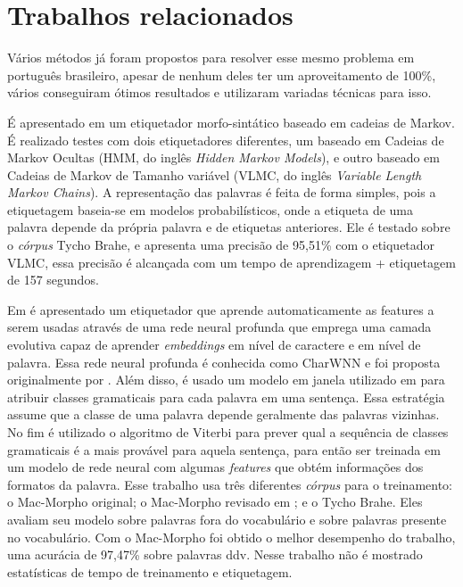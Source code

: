 \chapter{Trabalhos relacionados}\label{trabalhosrelacionados}

Vários métodos já foram propostos para resolver esse mesmo problema em português brasileiro, apesar de nenhum deles ter um aproveitamento de 100\%, vários conseguiram ótimos resultados e utilizaram variadas técnicas para isso.

É apresentado em \cite{kepler2005etiquetador} um etiquetador morfo-sintático baseado em cadeias de Markov. É realizado testes com dois etiquetadores diferentes, um baseado em Cadeias de Markov Ocultas (HMM, do inglês \textit{Hidden Markov Models}), e outro baseado em Cadeias de Markov de Tamanho variável (VLMC, do inglês \textit{Variable Length Markov Chains}). A representação das palavras é feita de forma simples, pois a etiquetagem baseia-se em modelos probabilísticos, onde a etiqueta de uma palavra depende da própria palavra e de etiquetas anteriores. Ele é testado sobre o \textit{córpus} Tycho Brahe, e apresenta uma precisão de 95,51\% com o etiquetador VLMC, essa precisão é alcançada com um tempo de aprendizagem + etiquetagem de 157 segundos. 

Em \cite{dos2014training} é apresentado um etiquetador que aprende automaticamente as features a serem usadas através de uma rede neural profunda que emprega uma camada evolutiva capaz de aprender \textit{embeddings} em nível de caractere e em nível de palavra. Essa rede neural profunda é conhecida como CharWNN e foi proposta originalmente por . Além disso, é usado um modelo em janela utilizado em \cite{collobert2011natural} para atribuir classes gramaticais para cada palavra em uma sentença. Essa estratégia assume que a classe de uma palavra depende geralmente das palavras vizinhas. No fim é utilizado o algoritmo de Viterbi \cite{viterbi1967error} para prever qual a sequência de classes gramaticais é a mais provável para aquela sentença, para então ser treinada em um modelo de rede neural com algumas \textit{features} que obtém informações dos formatos da palavra. Esse trabalho usa três diferentes \textit{córpus} para o treinamento: o Mac-Morpho original; o Mac-Morpho revisado em \cite{fonseca2013mac}; e o Tycho Brahe. Eles avaliam seu modelo sobre palavras fora do vocabulário e sobre palavras presente no vocabulário. Com o Mac-Morpho foi obtido o melhor desempenho do trabalho, uma acurácia de 97,47\% sobre palavras \ac{ddv}. Nesse trabalho não é mostrado estatísticas de tempo de treinamento e etiquetagem.

